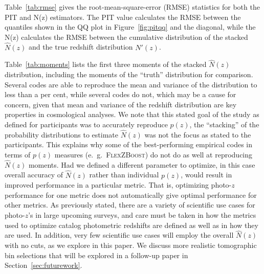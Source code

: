 Table~\ref{tab:rmse} gives the root-mean-square-error (RMSE) statistics for both the PIT and N(z) estimators.  The PIT value calculates the RMSE between the quantiles shown in the QQ plot in Figure~\ref{fig:pitqq} and the diagonal, while the N(z) calculates the RMSE between the cumulative distribution of the stacked $\hat{N}(z)$ and the true redshift distribution $N'(z)$.  %

Table~\ref{tab:moments} lists the first three moments of the stacked $\hat{N}(z)$ distribution, including the moments of the ``truth'' distribution for comparison.  Several codes are able to reproduce the mean and variance of the distribution to less than a per cent, while several codes do not, which may be a cause for concern, given that mean and variance of the redshift distribution are key properties in cosmological analyses.  We note that this stated goal of the study as defined for participants was to accurately reproduce $p(z)$, the ``stacking'' of the probability distributions to estimate $\hat{N}(z)$ was not the focus as stated to the participants.  This explains why some of the best-performing empirical codes in terms of $p(z)$ measures (e.~g.~\textsc{FlexZBoost}) do not do as well at reproducing $\hat{N}(z)$ moments.  Had we defined a different parameter to optimize, in this case overall accuracy of $\hat{N}(z)$ rather than individual $p(z)$, would result in improved performance in a particular metric.  That is, optimizing photo-$z$ performance for one metric does not automatically give optimal performance for other metrics.  As previously stated, there are a variety of scientific use cases for photo-$z$'s in large upcoming surveys, and care must be taken in how the metrics used to optimize catalog photometric redshifts are defined as well as in how they are used.  In addition, very few scientific use cases will employ the overall $\hat{N}(z)$ with no cuts, as we explore in this paper.  We discuss more realistic tomographic bin selections that will be explored in a follow-up paper in Section~\ref{sec:futurework}.

